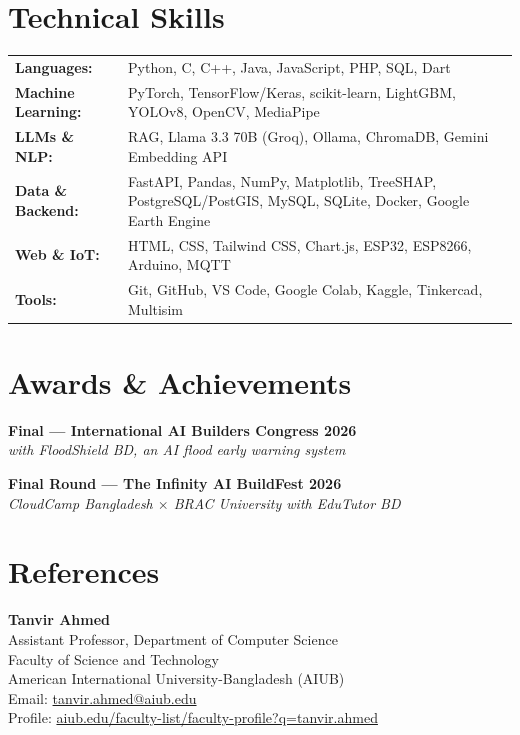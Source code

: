 \documentclass[10pt,a4paper]{article}
\newcommand{\resumeEntry}[3]{%
  \noindent\textbf{#1} \hfill #2\\
  {\textit{#3}}
}
\begin{document}
\section*{Technical Skills}
{\renewcommand{\arraystretch}{1.3}%
\begin{tabularx}{\textwidth}{@{}l X@{}}
\textbf{Languages:}         & Python, C, C++, Java, JavaScript, PHP, SQL, Dart \\
\textbf{Machine Learning:}  & PyTorch, TensorFlow/Keras, scikit-learn, LightGBM, YOLOv8, OpenCV, MediaPipe \\
\textbf{LLMs \& NLP:}       & RAG, Llama 3.3 70B (Groq), Ollama, ChromaDB, Gemini Embedding API \\
\textbf{Data \& Backend:}   & FastAPI, Pandas, NumPy, Matplotlib, \mbox{TreeSHAP}, PostgreSQL/PostGIS, MySQL, SQLite, Docker, Google Earth Engine \\
\textbf{Web \& IoT:}        & HTML, CSS, Tailwind CSS, Chart.js, ESP32, ESP8266, Arduino, MQTT \\
\textbf{Tools:}             & Git, GitHub, VS Code, Google Colab, Kaggle, Tinkercad, Multisim \\
\end{tabularx}}

\section*{Awards \& Achievements}

\resumeEntry{Final --- International AI Builders Congress 2026}{}{with FloodShield BD, an AI flood early warning system}

\resumeEntry{Final Round --- The Infinity AI BuildFest 2026}{}{CloudCamp Bangladesh $\times$ BRAC University \textperiodcentered{} with EduTutor BD}

\section*{References}
\textbf{Tanvir Ahmed}\\
Assistant Professor, Department of Computer Science\\
Faculty of Science and Technology\\
American International University-Bangladesh (AIUB)\\
{\hypersetup{urlcolor=black}Email: \href{mailto:tanvir.ahmed@aiub.edu}{tanvir.ahmed@aiub.edu}}\\
{\hypersetup{urlcolor=black}Profile: \href{https://www.aiub.edu/faculty-list/faculty-profile?q=tanvir.ahmed}{aiub.edu/faculty-list/faculty-profile?q=tanvir.ahmed}}
\end{document}

